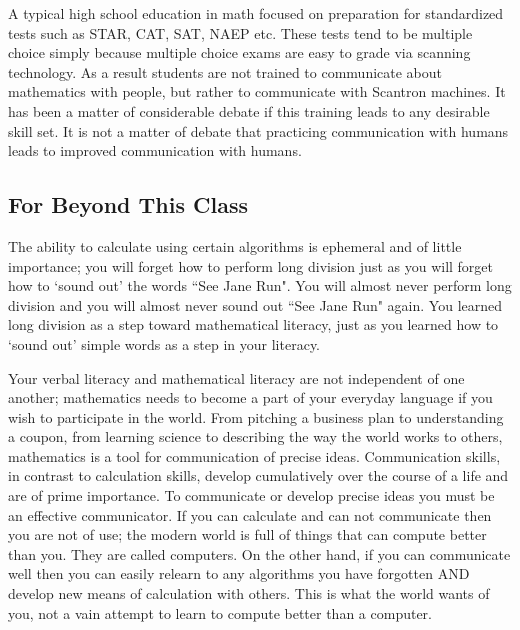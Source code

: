 \documentclass[12pt]{article}
\begin{document}
A typical high school education in math %
focused on preparation for standardized tests such as STAR, CAT, SAT, NAEP etc. These tests tend to be multiple choice simply because multiple choice exams are easy to grade via scanning technology. 
As a result students are not trained to communicate about mathematics with people, 
but rather to communicate with Scantron machines. 
It has been a matter of considerable debate if this training leads to any desirable skill set. It is not a matter of debate that practicing communication with humans leads to improved communication with humans. 

\subsection*{For Beyond This Class} 
The ability to calculate using certain algorithms is ephemeral and of little importance; 
you will forget how to perform long division just as you will forget how to `sound out' the words ``See Jane Run". 
You will almost never perform long division 
and you will almost never sound out ``See Jane Run" again. 
You learned long division as a step toward mathematical literacy, 
just as you learned how to `sound out' simple words as a step in your literacy. 

Your verbal literacy and mathematical literacy are not independent of one another; mathematics needs to become a part of your everyday language if you wish to participate in the world. 
From pitching a business plan to understanding a coupon, 
from learning science to describing the way the world works to others, 
mathematics is a tool for communication of precise ideas.
Communication skills, in contrast to calculation skills, develop cumulatively over the course of a life and are of prime importance. 
To communicate or develop precise ideas you must be an effective communicator. 
If you can calculate and can not communicate then you are not of use; the modern world is full of things that can compute better than you. They are called computers. On the other hand, if you can communicate well 
then you can easily relearn to any algorithms you have forgotten 
AND develop new means of calculation with others. 
This is what the world wants of you, not a vain attempt to learn to compute better than a computer.
\end{document}
